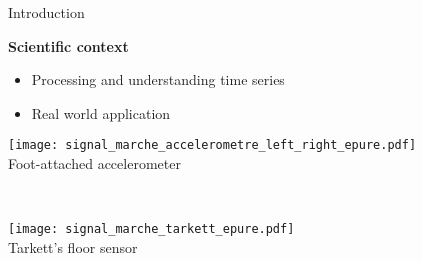 \begin{frame}{Introduction}
\begin{minipage}[t]{0.47\linewidth}
        \pause
        \medskip
        \centering\textbf{Scientific context}
        \begin{itemize}
            \item Processing and understanding time series
            \item Real world application
        \end{itemize}
        \centering
        \begin{minipage}[t]{0.9\linewidth}
            \vspace{0.5pt}
            \centering
            \texttt{[image: signal\_marche\_accelerometre\_left\_right\_epure.pdf]}\\
            {\small Foot-attached accelerometer}
        \end{minipage}\\
        \smallskip
        \begin{minipage}[t]{0.9\linewidth}
            \vspace{0pt}
            \centering
            \texttt{[image: signal\_marche\_tarkett\_epure.pdf]}\\
            {\small Tarkett's floor sensor}
        \end{minipage}
        

\end{minipage}
\end{frame}
